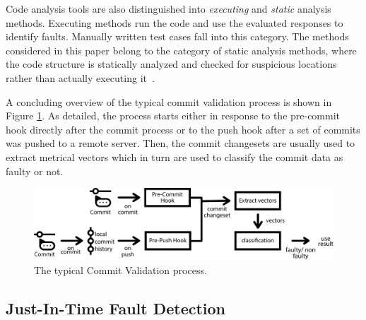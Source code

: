 Code analysis tools are also distinguished into \textit{executing} and \textit{static} analysis methods. Executing methods run the code and use the evaluated responses to identify faults. Manually written test cases fall into this category. The methods considered in this paper belong to the category of static analysis methods, where the code structure is statically analyzed and checked for suspicious locations rather than actually executing it~\cite{Wichmann1995}.

A concluding overview of the typical commit validation process is shown in Figure \ref{fig:cvprocess}. As detailed, the process starts either in response to the pre-commit hook directly after the commit process or to the push hook after a set of commits was pushed to a remote server. Then, the commit changesets are usually used to extract metrical vectors which in turn are used to classify the commit data as faulty or not.

\begin{figure}[t]
	\centering
	\includegraphics[width=\textwidth]{images/commitvalidation-process/typicalprocess-pdf}
	\caption{The typical Commit Validation process.}
	\label{fig:cvprocess}
\end{figure}

\subsection{Just-In-Time Fault Detection}

